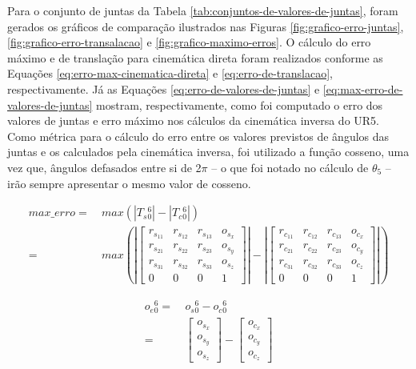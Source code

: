 \FloatBarrier

Para o conjunto de juntas da Tabela \ref{tab:conjuntos-de-valores-de-juntas}, foram gerados os gráficos de comparação
ilustrados nas Figuras \ref{fig:grafico-erro-juntas}, \ref{fig:grafico-erro-transalacao} e
\ref{fig:grafico-maximo-erros}. O cálculo do erro máximo e de translação para cinemática direta
foram realizados conforme as Equações \ref{eq:erro-max-cinematica-direta} e \ref{eq:erro-de-translacao},
respectivamente. Já as Equações \ref{eq:erro-de-valores-de-juntas} e \ref{eq:max-erro-de-valores-de-juntas}
mostram, respectivamente, como foi computado o erro dos valores de juntas e erro máximo nos
cálculos da cinemática inversa do UR5. Como métrica para o cálculo do erro entre os valores 
previstos de ângulos das juntas e os  calculados pela cinemática inversa, foi utilizado a função cosseno,
uma vez que, ângulos defasados entre si de 2$\pi$ – o que foi notado no cálculo de $\theta_{5}$ – irão sempre
apresentar o mesmo valor de cosseno.

\begin{equation}\label{eq:erro-max-cinematica-direta}
	\begin{split}
		max\_erro = &\: max \left (\left | T_s{_{0}^{6}}\right | - \left | T_c{_{0}^{6}}\right | \right) \quad \quad\\
		= &\: max \left ( \left |
		\begin{bmatrix}
			r_{s_{11}} & r_{s_{12}} & r_{s_{13}} & o_{s_{x}} \\ 
			r_{s_{21}} & r_{s_{22}} & r_{s_{23}} & o_{s_{y}} \\ 
			r_{s_{31}} & r_{s_{32}} & r_{s_{33}} & o_{s_{z}} \\ 
			    0      &      0     &      0     &      1
		\end{bmatrix}
		\right |
		-
		\left |
		\begin{bmatrix}
			r_{c_{11}} & r_{c_{12}} & r_{c_{13}} & o_{c_{x}} \\ 
			r_{c_{21}} & r_{c_{22}} & r_{c_{23}} & o_{c_{y}} \\ 
			r_{c_{31}} & r_{c_{32}} & r_{c_{33}} & o_{c_{z}} \\ 
			    0      &      0     &      0     &      1
		\end{bmatrix}
		\right | \right )
	\end{split}
\end{equation}

\begin{equation}\label{eq:erro-de-translacao}
	\begin{split}
		o_e{_{0}^{6}} = &\: o_s{_{0}^{6}} - o_c{_{0}^{6}}\\
		= &\:
		\begin{bmatrix}
			o_{s_{x}} \\ 
			o_{s_{y}} \\ 
			o_{s_{z}}
		\end{bmatrix}
		-
		\begin{bmatrix}
			o_{c_{x}} \\ 
			o_{c_{y}} \\ 
			o_{c_{z}}
		\end{bmatrix}
	\end{split}
\end{equation}

